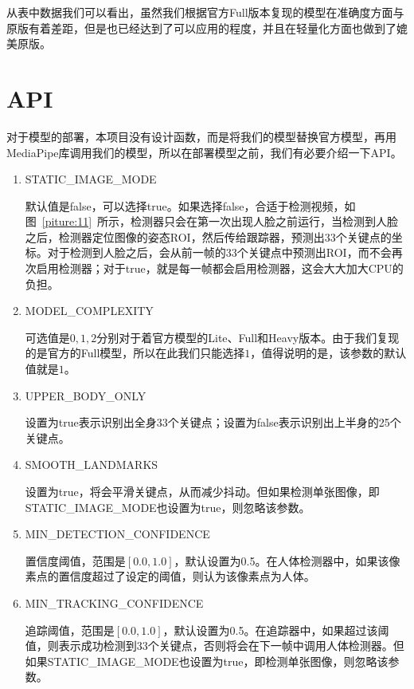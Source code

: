 从表中数据我们可以看出，虽然我们根据官方Full版本复现的模型在准确度方面与原版有着差距，但是也已经达到了可以应用的程度，并且在轻量化方面也做到了媲美原版。

\section{API}
对于模型的部署，本项目没有设计函数，而是将我们的模型替换官方模型，再用MediaPipe库调用我们的模型，所以在部署模型之前，我们有必要介绍一下API。

\begin{enumerate}
\item STATIC\_IMAGE\_MODE

\qquad \quad 默认值是false，可以选择true。如果选择false，合适于检测视频，如图~\ref{piture:11}~所示，检测器只会在第一次出现人脸之前运行，当检测到人脸之后，检测器定位图像的姿态ROI，然后传给跟踪器，预测出33个关键点的坐标。对于检测到人脸之后，会从前一帧的33个关键点中预测出ROI，而不会再次启用检测器；对于true，就是每一帧都会启用检测器，这会大大加大CPU的负担。

\item MODEL\_COMPLEXITY

\qquad \quad 可选值是$0,1,2$分别对于着官方模型的Lite、Full和Heavy版本。由于我们复现的是官方的Full模型，所以在此我们只能选择$1$，值得说明的是，该参数的默认值就是$1$。

\item UPPER\_BODY\_ONLY

\qquad \quad 设置为true表示识别出全身33个关键点；设置为false表示识别出上半身的25个关键点。

\item SMOOTH\_LANDMARKS

\qquad \quad 设置为true，将会平滑关键点，从而减少抖动。但如果检测单张图像，即STATIC\_IMAGE\_MODE也设置为true，则忽略该参数。

\item MIN\_DETECTION\_CONFIDENCE

\qquad \quad 置信度阈值，范围是$[0.0,1.0]$，默认设置为0.5。在人体检测器中，如果该像素点的置信度超过了设定的阈值，则认为该像素点为人体。

\item MIN\_TRACKING\_CONFIDENCE

\qquad \quad 追踪阈值，范围是$[0.0,1.0]$，默认设置为0.5。在追踪器中，如果超过该阈值，则表示成功检测到33个关键点，否则将会在下一帧中调用人体检测器。但如果STATIC\_IMAGE\_MODE也设置为true，即检测单张图像，则忽略该参数。
\end{enumerate}

